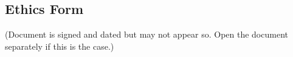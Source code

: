 \begin{appendices}
\chapter{Ethics Form}\label{appendix:ethics}
(Document is signed and dated but may not appear so. Open the document separately if this is the case.)


\end{appendices}